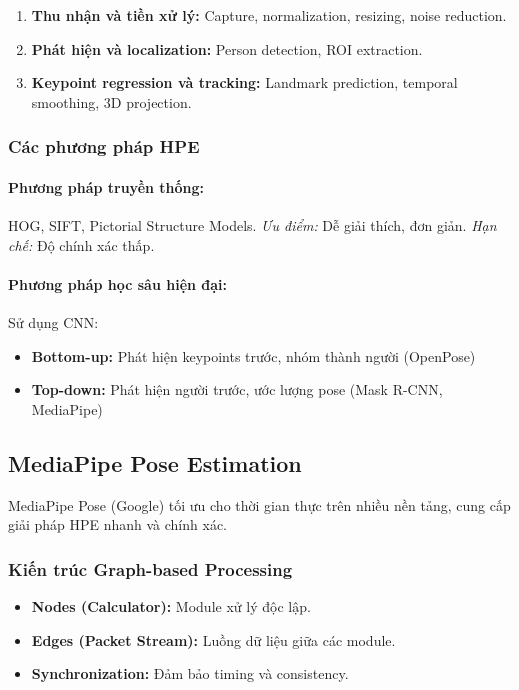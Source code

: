 \begin{enumerate}
    \item \textbf{Thu nhận và tiền xử lý:} Capture, normalization, resizing, noise reduction.
    \item \textbf{Phát hiện và localization:} Person detection, ROI extraction.
    \item \textbf{Keypoint regression và tracking:} Landmark prediction, temporal smoothing, 3D projection.
\end{enumerate}

\subsubsection{Các phương pháp HPE}

\paragraph{Phương pháp truyền thống:} HOG, SIFT, Pictorial Structure Models.  
\textit{Ưu điểm:} Dễ giải thích, đơn giản.  
\textit{Hạn chế:} Độ chính xác thấp.  

\paragraph{Phương pháp học sâu hiện đại:} Sử dụng CNN:
\begin{itemize}
    \item \textbf{Bottom-up:} Phát hiện keypoints trước, nhóm thành người (OpenPose)
    \item \textbf{Top-down:} Phát hiện người trước, ước lượng pose (Mask R-CNN, MediaPipe)
\end{itemize}

\subsection{MediaPipe Pose Estimation}

MediaPipe Pose (Google) tối ưu cho thời gian thực trên nhiều nền tảng, cung cấp giải pháp HPE nhanh và chính xác.

\subsubsection{Kiến trúc Graph-based Processing}

\begin{itemize}
    \item \textbf{Nodes (Calculator):} Module xử lý độc lập.
    \item \textbf{Edges (Packet Stream):} Luồng dữ liệu giữa các module.
    \item \textbf{Synchronization:} Đảm bảo timing và consistency.
\end{itemize}

